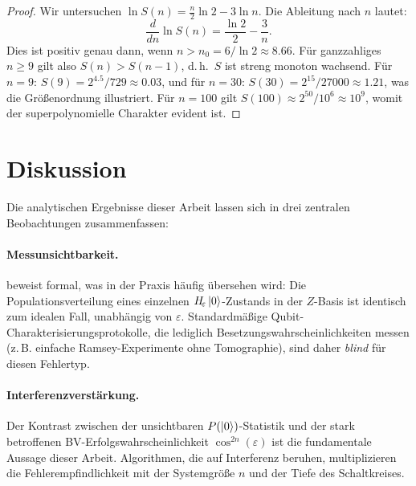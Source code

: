 ﻿\documentclass[11pt,a4paper]{article}
\theoremstyle{definition}
\newcommand{\eps}{\varepsilon}
\newcommand{\Heps}{H_{\!\varepsilon}}
\begin{document}
\begin{proof}
  Wir untersuchen $\ln S(n) = \tfrac{n}{2}\ln 2 - 3 \ln n$.  Die Ableitung
  nach $n$ lautet:
  \begin{equation}
    \frac{d}{dn} \ln S(n) = \frac{\ln 2}{2} - \frac{3}{n}.
  \end{equation}
  Dies ist positiv genau dann, wenn $n > n_0 = 6/\ln 2 \approx 8.66$.
  Für ganzzahliges $n \geq 9$ gilt also $S(n) > S(n-1)$, d.\,h.\ $S$ ist
  streng monoton wachsend.  Für $n = 9$: $S(9) = 2^{4.5}/729 \approx 0.03$,
  und für $n = 30$: $S(30) = 2^{15}/27000 \approx 1.21$, was die Größenordnung
  illustriert.  Für $n = 100$ gilt $S(100) \approx 2^{50}/10^6 \approx 10^9$,
  womit der superpolynomielle Charakter evident ist.
\end{proof}

\section{Diskussion}
\label{sec:discussion}

Die analytischen Ergebnisse dieser Arbeit lassen sich in drei zentralen
Beobachtungen zusammenfassen:

\paragraph{Messunsichtbarkeit.}
 beweist formal, was in der Praxis häufig übersehen wird:
Die Populationsverteilung eines einzelnen $\Heps\ket{0}$-Zustands in der
$Z$-Basis ist identisch zum idealen Fall, unabhängig von $\eps$.
Standardmäßige Qubit-Charakterisierungsprotokolle, die lediglich
Besetzungswahrscheinlichkeiten messen (z.\,B. einfache Ramsey-Experimente
ohne Tomographie), sind daher \emph{blind} für diesen Fehlertyp.

\paragraph{Interferenzverstärkung.}
Der Kontrast zwischen der unsichtbaren $P(\ket{0})$-Statistik und der
stark betroffenen BV-Erfolgswahrscheinlichkeit $\cos^{2n}(\eps)$ ist
die fundamentale Aussage dieser Arbeit.  Algorithmen, die auf
Interferenz beruhen, multiplizieren die Fehlerempfindlichkeit mit der
Systemgröße $n$ und der Tiefe des Schaltkreises.
\end{document}
